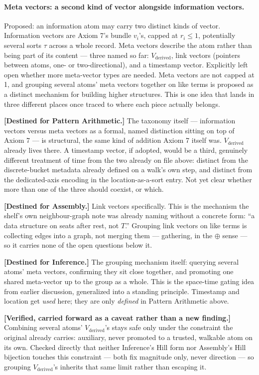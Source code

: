 \documentclass[11pt]{article}
\begin{document}
\paragraph{Meta vectors: a second kind of vector alongside information
vectors.} Proposed: an information atom may carry two distinct kinds
of vector. Information vectors are Axiom 7's bundle $v_i$'s, capped at
$r_i\le1$, potentially several sorts $\tau$ across a whole record.
Meta vectors describe the atom rather than being part of its content
--- three named so far: $V_{\text{derived}}$, link vectors (pointers
between atoms, one- or two-directional), and a timestamp vector.
Explicitly left open whether more meta-vector types are needed. Meta
vectors are not capped at 1, and grouping several atoms' meta vectors
together on like terms is proposed as a distinct mechanism for
building higher structures. This is one idea that lands in three
different places once traced to where each piece actually belongs.

\textbf{[Destined for Pattern Arithmetic.]} The taxonomy itself ---
information vectors versus meta vectors as a formal, named distinction
sitting on top of Axiom 7 --- is structural, the same kind of addition
Axiom 7 itself was. $V_{\text{derived}}$ already lives there. A
timestamp vector, if adopted, would be a third, genuinely different
treatment of time from the two already on file above: distinct from
the discrete-bucket metadata already defined on a walk's own step, and
distinct from the dedicated-axis encoding in the location-as-a-sort
entry. Not yet clear whether more than one of the three should
coexist, or which.

\textbf{[Destined for Assembly.]} Link vectors specifically. This is
the mechanism the shelf's own neighbour-graph note was already naming
without a concrete form: ``a data structure on seats after rest, not
$T$.'' Grouping link vectors on like terms is collecting edges into a
graph, not merging them --- gathering, in the $\oplus$ sense --- so
it carries none of the open questions below it.

\textbf{[Destined for Inference.]} The grouping mechanism itself:
querying several atoms' meta vectors, confirming they sit close
together, and promoting one shared meta-vector up to the group as a
whole. This is the space-time gating idea from earlier discussion,
generalized into a standing principle. Timestamp and location get
\emph{used} here; they are only \emph{defined} in Pattern Arithmetic
above.

\textbf{[Verified, carried forward as a caveat rather than a new
finding.]} Combining several atoms' $V_{\text{derived}}$'s stays safe
only under the constraint the original already carries: auxiliary,
never promoted to a trusted, walkable atom on its own. Checked
directly that neither Inference's Hill form nor Assembly's Hill
bijection touches this constraint --- both fix magnitude only, never
direction --- so grouping $V_{\text{derived}}$'s inherits that same
limit rather than escaping it.
\end{document}
